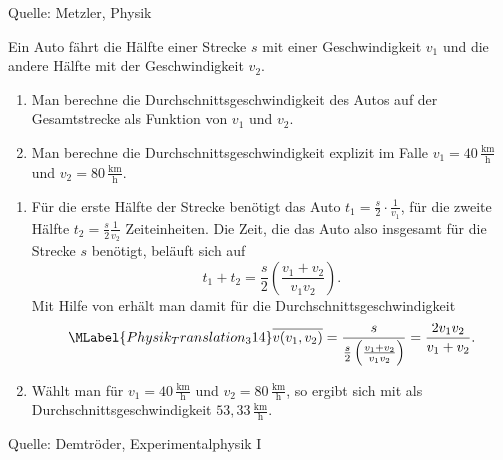 \begin{MExercises}
\begin{MExercise}
\begin{MSolution}
       \end{MSolution}
       
       Quelle: Metzler, Physik   
       \end{MExercise}
       
       \begin{MExercise}
            Ein Auto f\"ahrt die H\"alfte einer Strecke $s$ mit einer Geschwindigkeit $v_1$ und die andere H\"alfte mit der Geschwindigkeit $v_2$.
            \begin{enumerate} 
            \item Man berechne die Durchschnittsgeschwindigkeit des Autos auf der Gesamtstrecke als Funktion von $v_1$ und $v_2$.
            \item Man berechne die Durchschnittsgeschwindigkeit explizit im Falle $v_1= 40 \,\frac{\text{km}}{\text{h}}$ und $v_2= 80 \,\frac{\text{km}}{\text{h}}$.
            \end{enumerate}
            
            \begin{MSolution}
            \begin{enumerate}
            \item F\"ur die erste H\"alfte der Strecke ben\"otigt das Auto $t_1=\frac{s}{2}\cdot\frac{1}{v_1}$, f\"ur die zweite H\"alfte $t_2=\frac{s}{2}\frac{1}{v_2}$ Zeiteinheiten. Die Zeit, die das Auto also insgesamt f\"ur die Strecke $s$ ben\"otigt, bel\"auft sich auf
            $$
            t_1+t_2=\frac{s}{2}\left(\frac{v_1+v_2}{v_1v_2}\right).
            $$Mit Hilfe von  erh\"alt man damit f\"ur die Durchschnittsgeschwindigkeit
            \begin{equation}\MLabel{Physik_Translation_314}
            \overline{v(v_1,v_2)}=\frac{s}{\frac{s}{2}\left(\frac{v_1+v_2}{v_1v_2}\right)}=\frac{2v_1v_2}{v_1+v_2}.
            \end{equation}
            \item W\"ahlt man f\"ur $v_1= 40\, \frac{\text{km}}{\text{h}}$ und $v_2= 80 \,\frac{\text{km}}{\text{h}}$, so ergibt sich mit  als Durchschnittsgeschwindigkeit ${53,33} \,\frac{\text{km}}{\text{h}}$.\\
            \end{enumerate}
            \end{MSolution}
            
            Quelle: Demtr\"oder, Experimentalphysik I
            \end{MExercise}
            

\end{MExercises}
